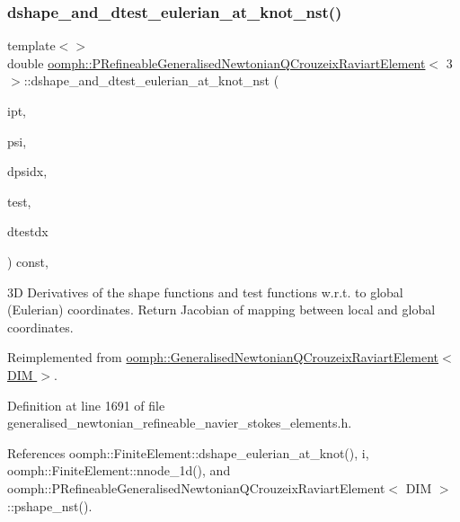 \subsubsection{\texorpdfstring{dshape\+\_\+and\+\_\+dtest\+\_\+eulerian\+\_\+at\+\_\+knot\+\_\+nst()}{dshape\_and\_dtest\_eulerian\_at\_knot\_nst()}\hspace{0.1cm}{\footnotesize\ttfamily [3/3]}}
{\footnotesize\ttfamily template$<$$>$ \\
double \hyperlink{classoomph_1_1PRefineableGeneralisedNewtonianQCrouzeixRaviartElement}{oomph\+::\+P\+Refineable\+Generalised\+Newtonian\+Q\+Crouzeix\+Raviart\+Element}$<$ 3 $>$\+::dshape\+\_\+and\+\_\+dtest\+\_\+eulerian\+\_\+at\+\_\+knot\+\_\+nst (\begin{DoxyParamCaption}\item[{const unsigned \&}]{ipt,  }\item[{\hyperlink{classoomph_1_1Shape}{Shape} \&}]{psi,  }\item[{\hyperlink{classoomph_1_1DShape}{D\+Shape} \&}]{dpsidx,  }\item[{\hyperlink{classoomph_1_1Shape}{Shape} \&}]{test,  }\item[{\hyperlink{classoomph_1_1DShape}{D\+Shape} \&}]{dtestdx }\end{DoxyParamCaption}) const\hspace{0.3cm}{\ttfamily [inline]}, {\ttfamily [virtual]}}

3D Derivatives of the shape functions and test functions w.\+r.\+t. to global (Eulerian) coordinates. Return Jacobian of mapping between local and global coordinates. 

Reimplemented from \hyperlink{classoomph_1_1GeneralisedNewtonianQCrouzeixRaviartElement_a8320a0d6ad5e4f9a19ab412fb69c00e7}{oomph\+::\+Generalised\+Newtonian\+Q\+Crouzeix\+Raviart\+Element$<$ D\+I\+M $>$}.



Definition at line 1691 of file generalised\+\_\+newtonian\+\_\+refineable\+\_\+navier\+\_\+stokes\+\_\+elements.\+h.



References oomph\+::\+Finite\+Element\+::dshape\+\_\+eulerian\+\_\+at\+\_\+knot(), i, oomph\+::\+Finite\+Element\+::nnode\+\_\+1d(), and oomph\+::\+P\+Refineable\+Generalised\+Newtonian\+Q\+Crouzeix\+Raviart\+Element$<$ D\+I\+M $>$\+::pshape\+\_\+nst().

\mbox{\label{classoomph_1_1PRefineableGeneralisedNewtonianQCrouzeixRaviartElement_a4cc8b7e4932fe27129f5e6b4dcba07dc}} 
